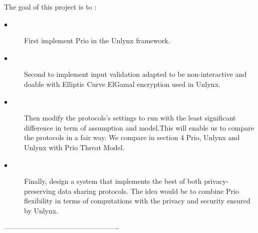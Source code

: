 \documentclass{article}
\begin{document}
The goal of this project is to :
\begin{description}
\item[$\bullet$] First implement Prio in the Unlynx framework.
\item[$\bullet$] Second to implement input validation \cite{range} adapted to be non-interactive and doable with Elliptic Curve ElGamal encryption used in Unlynx.
\item[$\bullet$]{Then modify the protocols's settings to run with the least significant difference in term of assumption and model.This will enable us to compare the protocols in a fair way. We compare in section 4 Prio, Unlynx and Unlynx with Prio Threat Model.}
\item[$\bullet$] Finally, design a system that implements the best of both privacy-preserving data sharing protocols. The idea would be to combine Prio flexibility in terms of computations with the privacy and security ensured by Unlynx.\\
\end{description}

-------------------------------------------------

\newpage
\tableofcontents
\newpage


\end{document}
